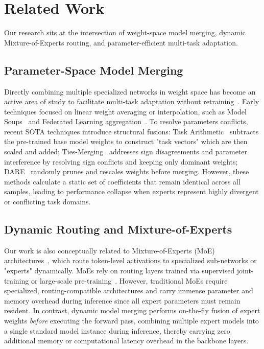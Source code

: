 \section{Related Work}
\label{sec:related_work}

Our research sits at the intersection of weight-space model merging, dynamic Mixture-of-Experts routing, and parameter-efficient multi-task adaptation. 

\subsection{Parameter-Space Model Merging}
Directly combining multiple specialized networks in weight space has become an active area of study to facilitate multi-task adaptation without retraining~\cite{he2016deep, modelsoups}. Early techniques focused on linear weight averaging or interpolation, such as Model Soups~\cite{wortsman2022model} and Federated Learning aggregation~\cite{federated_learning}. To resolve parameters conflicts, recent SOTA techniques introduce structural fusions: Task Arithmetic~\cite{ilharco2022editing} subtracts the pre-trained base model weights to construct "task vectors" which are then scaled and added; Ties-Merging~\cite{yadav2023ties} addresses sign disagreements and parameter interference by resolving sign conflicts and keeping only dominant weights; DARE~\cite{dare} randomly prunes and rescales weights before merging. However, these methods calculate a static set of coefficients that remain identical across all samples, leading to performance collapse when experts represent highly divergent or conflicting task domains.

\subsection{Dynamic Routing and Mixture-of-Experts}
Our work is also conceptually related to Mixture-of-Experts (MoE) architectures~\cite{moe}, which route token-level activations to specialized sub-networks or "experts" dynamically. MoEs rely on routing layers trained via supervised joint-training or large-scale pre-training~\cite{switch_transformers, jacobs1991adaptive}. However, traditional MoEs require specialized, routing-compatible architectures and carry immense parameter and memory overhead during inference since all expert parameters must remain resident. In contrast, dynamic model merging performs on-the-fly fusion of expert weights \emph{before} executing the forward pass, combining multiple expert models into a single standard model instance during inference, thereby carrying zero additional memory or computational latency overhead in the backbone layers.

